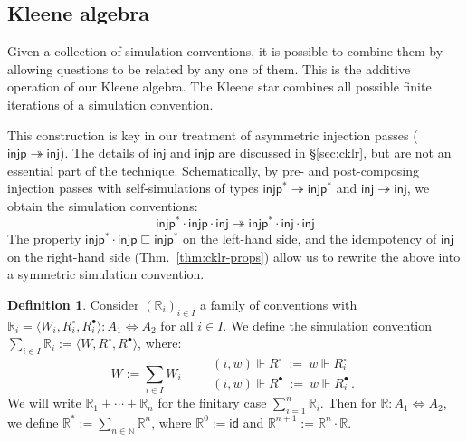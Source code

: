 \documentclass[11pt,oneside,draft]{book}
\theoremstyle{definition}
\newtheorem{definition}[theorem]{Definition}
\newcommand{\kw}[1]{\ensuremath{ \mathsf{#1} }}
\newcommand{\que}{\circ}         %
\newcommand{\ans}{\bullet}       %
\newcommand{\scref}{\sqsubseteq} %
\begin{document}
\subsection{Kleene algebra} %

Given a collection of simulation conventions,
it is possible to combine them
by allowing questions to be related by any one of them.
This is the additive operation of our Kleene algebra.
The Kleene star combines all possible finite iterations
of a simulation convention.

This construction is key in our treatment of
asymmetric injection passes
($\kw{injp} \twoheadrightarrow \kw{inj}$).
The details of $\kw{inj}$ and $\kw{injp}$
are discussed in \S\ref{sec:cklr},
but are not an essential part of the technique.
Schematically,
by pre- and post-composing injection passes
with self-simulations of types
$\kw{injp}^* \twoheadrightarrow \kw{injp}^*$ and
$\kw{inj} \twoheadrightarrow \kw{inj}$,
we obtain the simulation conventions:
\[
  \kw{injp}^* \cdot \kw{injp} \cdot \kw{inj}
  \twoheadrightarrow
  \kw{injp}^* \cdot \kw{inj} \cdot \kw{inj}
\]
The property $\kw{injp}^* \cdot \kw{injp} \scref \kw{injp}^*$
on the left-hand side,
and the idempotency of $\kw{inj}$
on the right-hand side (Thm.~\ref{thm:cklr-props})
allow us to rewrite the above into
a symmetric simulation convention.

\begin{definition} \label{def:joins} %
Consider $(\mathbb{R}_i)_{i \in I}$
a family of conventions
with
$\mathbb{R}_i = \langle W_i, R_i^\que, R_i^\ans \rangle
  : A_1 \Leftrightarrow A_2$
for all $i \in I$.
We define the simulation convention
$\sum_{i \in I} \mathbb{R}_i := \langle W, R^\que, R^\ans \rangle$,
where:
\[
  W := \sum_{i \in I} W_i  \qquad
  \begin{array}{l}
  (i, w) \Vdash R^\que \: := \: w \Vdash R_i^\que \\[1ex]
  (i, w) \Vdash R^\ans \: := \: w \Vdash R_i^\ans \,.
  \end{array}
\]
We will write $\mathbb{R}_1 + \cdots + \mathbb{R}_n$
for the finitary case $\sum_{i=1}^n \mathbb{R}_i$.
Then for $\mathbb{R} : A_1 \Leftrightarrow A_2$,
we define
$\mathbb{R}^* := \sum_{n \in \mathbb{N}} \mathbb{R}^n$,
where
$\mathbb{R}^0 := \kw{id}$ and
$\mathbb{R}^{n+1} := \mathbb{R}^n \cdot \mathbb{R}$.
\end{definition}
\end{document}
